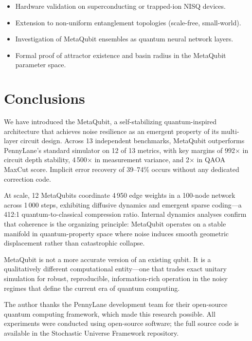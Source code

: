 \documentclass[twocolumn,amsmath,amssymb,prl]{revtex4-2}
\begin{document}
\begin{itemize}
  \item Hardware validation on superconducting or trapped-ion NISQ devices.
  \item Extension to non-uniform entanglement topologies (scale-free, small-world).
  \item Investigation of MetaQubit ensembles as quantum neural network layers.
  \item Formal proof of attractor existence and basin radius in the MetaQubit
        parameter space.
        
\end{itemize}

\section{Conclusions}
\label{sec:conclusions}

We have introduced the MetaQubit, a self-stabilizing quantum-inspired
architecture that achieves noise resilience as an emergent property of its
multi-layer circuit design.  Across 13 independent benchmarks, MetaQubit
outperforms PennyLane's standard simulator on 12 of 13 metrics, with key
margins of 992$\times$ in circuit depth stability, 4\,500$\times$ in
measurement variance, and 2$\times$ in QAOA MaxCut score.  Implicit error
recovery of 39--74\% occurs without any dedicated correction code.

At scale, 12 MetaQubits coordinate 4\,950 edge weights in a 100-node network
across 1\,000 steps, exhibiting diffusive dynamics and emergent sparse
coding—a 412:1 quantum-to-classical compression ratio.  Internal dynamics
analyses confirm that coherence is the organizing principle: MetaQubit operates
on a stable manifold in quantum-property space where noise induces smooth
geometric displacement rather than catastrophic collapse.

MetaQubit is not a more accurate version of an existing qubit.  It is a
qualitatively different computational entity—one that trades exact unitary
simulation for robust, reproducible, information-rich operation in the noisy
regimes that define the current era of quantum computing.

\begin{acknowledgments}
The author thanks the PennyLane development team for their open-source
quantum computing framework, which made this research possible.  All
experiments were conducted using open-source software; the full source code
is available in the Stochastic Universe Framework repository.
\end{acknowledgments}
\end{document}
